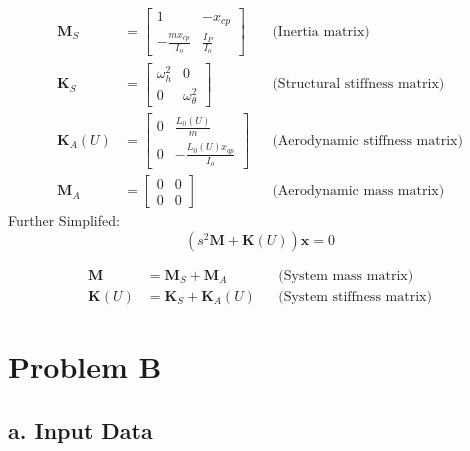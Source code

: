 \documentclass{article}
\begin{document}
\begin{align}
    \mathbf{M}_S &= \begin{bmatrix} 1 & -x_{cp} \\ -\frac{m x_{cp}}{I_o} & \frac{I_P}{I_o} \end{bmatrix} && \text{(Inertia matrix)} \label{eq:mass_structural} \\
    \mathbf{K}_S &= \begin{bmatrix} \omega_h^2 & 0 \\ 0 & \omega_\theta^2 \end{bmatrix} && \text{(Structural stiffness matrix)} \label{eq:stiffness_structural} \\
    \mathbf{K}_A(U) &= \begin{bmatrix} 0 & \frac{L_0(U)}{m} \\ 0 & -\frac{L_0(U) x_{qp}}{I_o} \end{bmatrix} && \text{(Aerodynamic stiffness matrix)} \label{eq:stiffness_aero} \\
    \mathbf{M}_A &= \begin{bmatrix} 0 & 0 \\ 0 & 0 \end{bmatrix} && \text{(Aerodynamic mass matrix)} \label{eq:mass_aero}
\end{align}
Further Simplifed:
\begin{equation}
(s^2 \mathbf{M} + \mathbf{K}(U)) \mathbf{x} = 0
\label{eq:eigenvalue_problem}
\end{equation}

\begin{align}
    \mathbf{M} &= \mathbf{M}_S + \mathbf{M}_A && \text{(System mass matrix)} \label{eq:system_mass} \\
    \mathbf{K}(U) &= \mathbf{K}_S + \mathbf{K}_A(U) && \text{(System stiffness matrix)} \label{eq:system_stiffness}
\end{align}

\newpage
\section{Problem B}


\subsection{a. Input Data}
\end{document}
